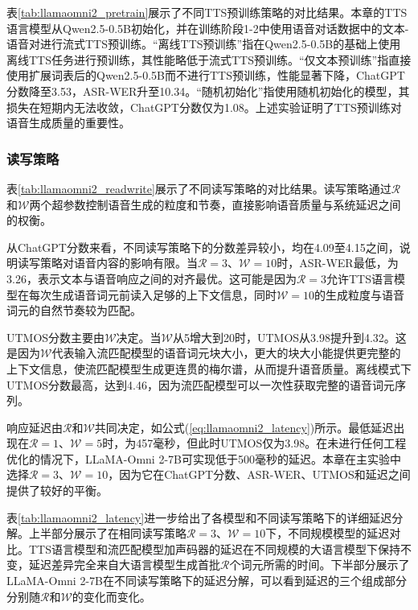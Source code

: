 

表\ref{tab:llamaomni2_pretrain}展示了不同TTS预训练策略的对比结果。本章的TTS语言模型从Qwen2.5-0.5B初始化，并在训练阶段1-2中使用语音对话数据中的文本-语音对进行流式TTS预训练。``离线TTS预训练''指在Qwen2.5-0.5B的基础上使用离线TTS任务进行预训练，其性能略低于流式TTS预训练。``仅文本预训练''指直接使用扩展词表后的Qwen2.5-0.5B而不进行TTS预训练，性能显著下降，ChatGPT分数降至3.53，ASR-WER升至10.34。``随机初始化''指使用随机初始化的模型，其损失在短期内无法收敛，ChatGPT分数仅为1.08。上述实验证明了TTS预训练对语音生成质量的重要性。

\subsubsection{读写策略}





表\ref{tab:llamaomni2_readwrite}展示了不同读写策略的对比结果。读写策略通过$\mathcal{R}$和$\mathcal{W}$两个超参数控制语音生成的粒度和节奏，直接影响语音质量与系统延迟之间的权衡。

从ChatGPT分数来看，不同读写策略下的分数差异较小，均在4.09至4.15之间，说明读写策略对语音内容的影响有限。当$\mathcal{R}=3$、$\mathcal{W}=10$时，ASR-WER最低，为3.26，表示文本与语音响应之间的对齐最优。这可能是因为$\mathcal{R}=3$允许TTS语言模型在每次生成语音词元前读入足够的上下文信息，同时$\mathcal{W}=10$的生成粒度与语音词元的自然节奏较为匹配。

UTMOS分数主要由$\mathcal{W}$决定。当$\mathcal{W}$从5增大到20时，UTMOS从3.98提升到4.32。这是因为$\mathcal{W}$代表输入流匹配模型的语音词元块大小，更大的块大小能提供更完整的上下文信息，使流匹配模型生成更连贯的梅尔谱，从而提升语音质量。离线模式下UTMOS分数最高，达到4.46，因为流匹配模型可以一次性获取完整的语音词元序列。

响应延迟由$\mathcal{R}$和$\mathcal{W}$共同决定，如公式(\ref{eq:llamaomni2_latency})所示。最低延迟出现在$\mathcal{R}=1$、$\mathcal{W}=5$时，为457毫秒，但此时UTMOS仅为3.98。在未进行任何工程优化的情况下，LLaMA-Omni 2-7B可实现低于500毫秒的延迟。本章在主实验中选择$\mathcal{R}=3$、$\mathcal{W}=10$，因为它在ChatGPT分数、ASR-WER、UTMOS和延迟之间提供了较好的平衡。

表\ref{tab:llamaomni2_latency}进一步给出了各模型和不同读写策略下的详细延迟分解。上半部分展示了在相同读写策略$\mathcal{R}=3$、$\mathcal{W}=10$下，不同规模模型的延迟对比。TTS语言模型和流匹配模型加声码器的延迟在不同规模的大语言模型下保持不变，延迟差异完全来自大语言模型生成首批$\mathcal{R}$个词元所需的时间。下半部分展示了LLaMA-Omni 2-7B在不同读写策略下的延迟分解，可以看到延迟的三个组成部分分别随$\mathcal{R}$和$\mathcal{W}$的变化而变化。

